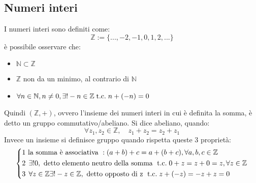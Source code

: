 \documentclass[a4paper,12pt]{article}
\begin{document}
	\subsection{Numeri interi}
	I numeri interi sono definiti come:
	\[\mathbb{Z} := \{..., -2, -1, 0, 1, 2, ...\}\]
	è possibile osservare che:
	\begin{itemize}
		\item $\mathbb{N} \subset \mathbb{Z}$
		\item $\mathbb{Z}$ non da un minimo, al contrario di $\mathbb{N}$
		\item $\forall n \in \mathbb{N}, n \not = 0, \exists! -n \in \mathbb{Z} \;\text{t.c.}\; n + (-n) = 0$
	\end{itemize}
	Quindi $(\mathbb{Z}, +)$, ovvero l'insieme dei numeri interi in cui è definita la somma, è detto un gruppo commutativo/abeliano.
	Si dice abeliano, quando:
	\[\forall z_1,z_2 \in \mathbb{Z}, \quad z_1 + z_2 = z_2 + z_1\]
	Invece un insieme si definisce gruppo quando rispetta queste 3 proprietà:
	\[
	\left\{\begin{aligned}
		1 & \text{ la somma è associativa }: (a+b) + c = a + (b + c), \forall a,b,c \in \mathbb{Z}\\
		2 & \; \, \exists! 0, \text{ detto elemento neutro della somma } \;\text{t.c.}\; 0 + z = z + 0 = z, \forall z \in \mathbb{Z}\\
		3 & \; \, \forall z \in \mathbb{Z} \exists! -z \in \mathbb{Z}, \text{ detto opposto di z } \;\text{t.c.}\; z + (-z) = - z + z = 0
	\end{aligned}\right.\]
	
\end{document}
